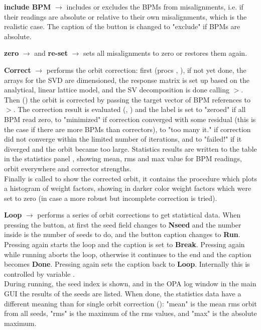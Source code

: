 \documentclass[12pt]{article}
\newcommand\code[1]{{\tt #1}}
\newcommand{\ofld}[1]{\colorbox{black!15}{{\bf #1}}}
\newcommand\guico[1]{{\color{blue}\code{#1}}}
\newcommand{\unico}[1]{{\color{burntorange}\code{#1}}}
\newcommand{\evcod}[2]{\ofld{#1} $\rightarrow$ \guico{#2}}
\newcommand{\prcod}[2]{\opauni{#1}$>$\unico{#2}}
\newcommand{\opagui}[1]{\colorbox{blue!20}{{\color{black}\code{#1}}}}
\newcommand{\ogui}[1]{\hyperref[#1]{\opagui{#1}}}
\newcommand{\opauni}[1]{\colorbox{orange!30}{{\color{black}\code{#1}}}}
\begin{document}
\evcod{include BPM}{butMonabsClick} includes or excludes the BPMs from misalignments, i.e. if their readings are absolute or relative to their own misalignments, which is the realistic case. The caption of the button is changed to "exclude" if BPMs are absolute.

\evcod{zero}{butZeroClick} and \evcod{re-set}{butSetAgainClick} sets all misalignments to zero or restores them again.

\evcod{Correct}{butCorClick} performs the orbit correction: first (procs \guico{PrepOrbCorr}, \guico{GetResponseMatrix}), if not yet done, the arrays for the SVD are dimensioned, the response matrix is set up based on the analytical, linear lattice model, and the SV decomposition is done calling \prcod{mathlib}{SVDCMP}. \\
Then (\guico{OrbitCorrection}) the orbit is corrected by passing the target vector of BPM references to \prcod{mathlib}{SVBKSB}. 
The correction result is evaluated (\guico{CodStat}, \guico{CodStatCalc}) and the label \guico{LabOrbStat} is set to "zeroed" if all BPM read zero, to "minimized" if correction converged with some residual (this is the case if there are more BPMs than correctors), to "too many it." if correction did not converge within the limited number of iterations, and to "failed!" if it diverged and the orbit became too large. Statistics results are written to the table in the statistics panel \guico{panctr}, showing mean, rms and max value for BPM readings, orbit everywhere and corrector strengths.\\
Finally \guico{MakePlot} is called to show the corrected orbit, it contains the procedure \guico{WeightPlot} which plots a histogram of weight factors, showing in darker color weight factors which were set to zero (in case a more robust but incomplete correction is tried).

\evcod{Loop}{butLoopClick} performs a series of orbit corrections to get statistical data. When pressing the button, at first the seed field changes to \ofld{Nseed} and the number inside is the number of seeds to do, and the button caption changes to \ofld{Run}.\\
Pressing again starts the loop and the caption is set to \ofld{Break}. Pressing again while running aborts the loop, otherwise it continues to the end and the caption becomes \ofld{Done}. Pressing again sets the caption back to \ofld{Loop}. Internally this is controlled by variable \guico{loopstatus}. \\
During running, the seed index is shown, and in the OPA log window in the main GUI \ogui{opamenu} the results of the seeds are listed. When done, the statistics data have a different meaning than for single orbit correction (\guico{LoopStatCalc}): "mean" is the mean rms orbit from all seeds, "rms" is the maximum of the rms values, and "max" is the absolute maximum.
\end{document}
